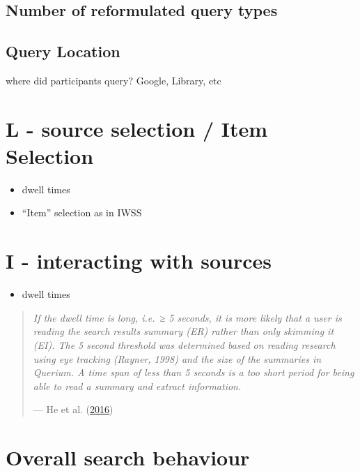 \documentclass[letterpaper, nobind]{templates/ociamthesis}
\providecommand{\tightlist}{%
  \setlength{\itemsep}{0pt}\setlength{\parskip}{0pt}}
\begin{document}
\hypertarget{number-of-reformulated-query-types}{%
\subsection{Number of reformulated query types}\label{number-of-reformulated-query-types}}

\hypertarget{query-location}{%
\subsection{Query Location}\label{query-location}}

where did participants query?
Google, Library, etc

\hypertarget{l---source-selection-item-selection}{%
\section{L - source selection / Item Selection}\label{l---source-selection-item-selection}}

\begin{itemize}
\tightlist
\item
  dwell times
\item
  ``Item'' selection as in IWSS
\end{itemize}

\hypertarget{i---interacting-with-sources}{%
\section{I - interacting with sources}\label{i---interacting-with-sources}}

\begin{itemize}
\tightlist
\item
  dwell times
\end{itemize}

\begin{quote}
\emph{If the dwell time is long, i.e.~≥ 5 seconds, it is more likely that a user is reading the search results summary (ER) rather than only skimming it (EI). The 5 second threshold was determined based on reading research using eye tracking (Rayner, 1998) and the size of the summaries in Querium. A time span of less than 5 seconds is a too short period for being able to read a summary and extract information.}

\hfill --- He et al. (\protect\hyperlink{ref-he2016beyond}{2016})
\end{quote}

\hypertarget{overall-search-behaviour}{%
\section{Overall search behaviour}\label{overall-search-behaviour}}
\end{document}
